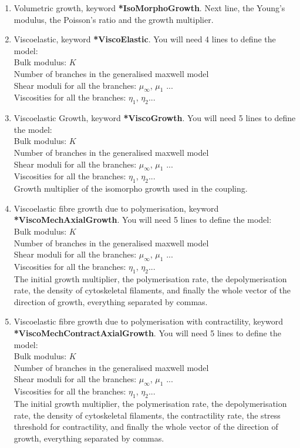 \documentclass[oneside,11pt,times]{book}
\begin{document}
\begin{enumerate}
\begin{itemize}
\end{itemize}
\item Volumetric growth, keyword \textbf{*IsoMorphoGrowth}. Next line, the Young's modulus, the Poisson's ratio and the growth multiplier.
\item Viscoelastic, keyword \textbf{*ViscoElastic}. You will need 4 lines to define the model:\\
Bulk modulus: $K$\\
Number of branches in the generalised maxwell model\\
Shear moduli for all the branches: $\mu_\infty$, $\mu_1$ ...\\
Viscosities for all the branches: $\eta_1$, $\eta_2$...
\item Viscoelastic Growth, keyword \textbf{*ViscoGrowth}. You will need 5 lines to define the model:\\
Bulk modulus: $K$\\
Number of branches in the generalised maxwell model\\
Shear moduli for all the branches: $\mu_\infty$, $\mu_1$ ...\\
Viscosities for all the branches: $\eta_1$, $\eta_2$...\\
Growth multiplier of the isomorpho growth used in the coupling.
\item Viscoelastic fibre growth due to polymerisation, keyword \textbf{*ViscoMechAxialGrowth}. You will need 5 lines to define the model:\\
Bulk modulus: $K$\\
Number of branches in the generalised maxwell model\\
Shear moduli for all the branches: $\mu_\infty$, $\mu_1$ ...\\
Viscosities for all the branches: $\eta_1$, $\eta_2$...\\
The initial growth multiplier, the polymerisation rate, the depolymerisation rate, the density of cytoskeletal filaments, and finally the whole vector of the direction of growth, everything separated by commas.
\item Viscoelastic fibre growth due to polymerisation with contractility, keyword \textbf{*ViscoMechContractAxialGrowth}. You will need 5 lines to define the model: \\
Bulk modulus: $K$\\
Number of branches in the generalised maxwell model\\
Shear moduli for all the branches: $\mu_\infty$, $\mu_1$ ...\\
Viscosities for all the branches: $\eta_1$, $\eta_2$...\\
The initial growth multiplier, the polymerisation rate, the depolymerisation rate, the density of cytoskeletal filaments, the contractility rate, the stress threshold for contractility, and finally the whole vector of the direction of growth, everything separated by commas.


\end{enumerate}
\end{document}
